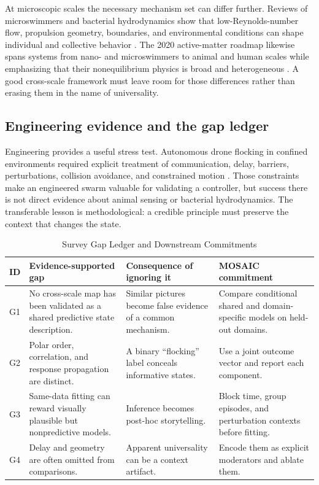 \documentclass[conference]{../../../../Conference-LaTeX-template_10-17-19/IEEEtran}
\begin{document}
At microscopic scales the necessary mechanism set can differ further. Reviews of microswimmers and bacterial hydrodynamics show that low-Reynolds-number flow, propulsion geometry, boundaries, and environmental conditions can shape individual and collective behavior \cite{elgeti,lauga}. The 2020 active-matter roadmap likewise spans systems from nano- and microswimmers to animal and human scales while emphasizing that their nonequilibrium physics is broad and heterogeneous \cite{gompper}. A good cross-scale framework must leave room for those differences rather than erasing them in the name of universality.

\subsection{Engineering evidence and the gap ledger}
Engineering provides a useful stress test. Autonomous drone flocking in confined environments required explicit treatment of communication, delay, barriers, perturbations, collision avoidance, and constrained motion \cite{vasarhelyi}. Those constraints make an engineered swarm valuable for validating a controller, but success there is not direct evidence about animal sensing or bacterial hydrodynamics. The transferable lesson is methodological: a credible principle must preserve the context that changes the state.

\begin{table}[t]
\caption{Survey Gap Ledger and Downstream Commitments}
\centering\small
\begin{tabularx}{\textwidth}{p{}Y Y Y}
\toprule
ID & Evidence-supported gap & Consequence of ignoring it & MOSAIC commitment\\
\midrule
G1 & No cross-scale map has been validated as a shared predictive state description. & Similar pictures become false evidence of a common mechanism. & Compare conditional shared and domain-specific models on held-out domains.\\
G2 & Polar order, correlation, and response propagation are distinct. & A binary ``flocking'' label conceals informative states. & Use a joint outcome vector and report each component.\\
G3 & Same-data fitting can reward visually plausible but nonpredictive models. & Inference becomes post-hoc storytelling. & Block time, group episodes, and perturbation contexts before fitting.\\
G4 & Delay and geometry are often omitted from comparisons. & Apparent universality can be a context artifact. & Encode them as explicit moderators and ablate them.\\
\bottomrule
\end{tabularx}
\end{table}
\end{document}

